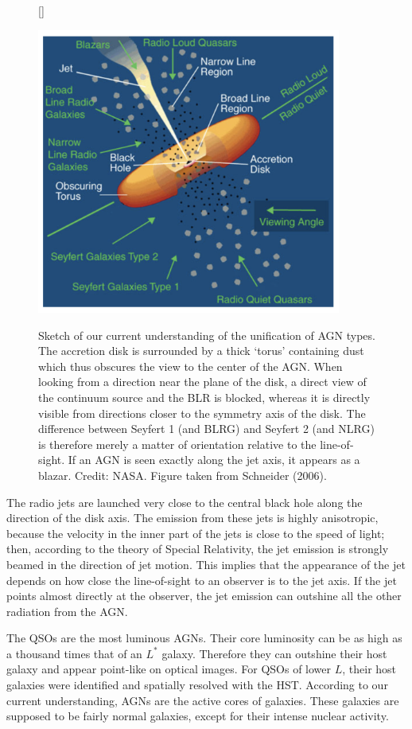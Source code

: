 \documentclass[a4paper,10pt]{article}
\begin{document}
\begin{figure}[t]
    [\FBwidth]
    {\caption{\footnotesize{Sketch of our current understanding of the unification of AGN types. The accretion disk is surrounded by a thick `torus' containing dust which thus obscures the view to the center of the AGN. When looking from a direction near the plane of the disk, a direct view of the continuum source and the BLR is blocked, whereas it is directly visible from directions closer to the symmetry axis of the disk. The difference between Seyfert 1 (and BLRG) and Seyfert 2 (and NLRG) is therefore merely a matter of orientation relative to the line-of-sight. If an AGN is seen exactly along the jet axis, it appears as a blazar. Credit: NASA. Figure taken from Schneider (2006).}}
    \label{fig:agn}}
    {\includegraphics[width=10cm]{figures/AGN.png}}
\end{figure}

{\noindent}The radio jets are launched very close to the central black hole along the direction of the disk axis. The emission from these jets is highly anisotropic, because the velocity in the inner part of the jets is close to the speed of light; then, according to the theory of Special Relativity, the jet emission is strongly beamed in the direction of jet motion. This implies that the appearance of the jet depends on how close the line-of-sight to an observer is to the jet axis. If the jet points almost directly at the observer, the jet emission can outshine all the other radiation from the AGN. 

{\noindent}The QSOs are the most luminous AGNs. Their core luminosity can be as high as a thousand times that of an $L^*$  galaxy. Therefore they can outshine their host galaxy and appear point-like on optical images. For QSOs of lower $L$, their host galaxies were identified and spatially resolved with the HST. According to our current understanding, AGNs are the active cores of galaxies. These galaxies are supposed to be fairly normal galaxies, except for their intense nuclear activity.
\end{document}
